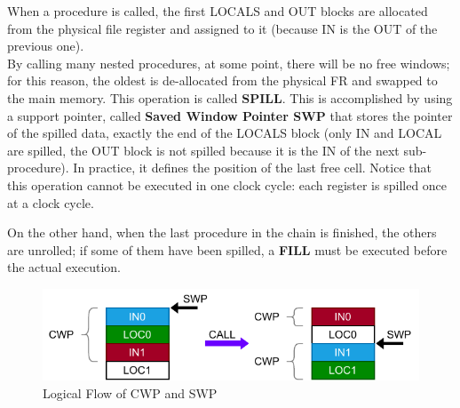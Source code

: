 When a procedure is called, the first LOCALS and OUT blocks are allocated from the physical file register and assigned to it (because IN is the OUT of the previous one).\\

By calling many nested procedures, at some point, there will be no free windows; for this reason, the oldest is de-allocated from the physical FR and swapped to the main memory. This operation is called \textbf{SPILL}. This is accomplished by using a support pointer, called \textbf{Saved Window Pointer SWP} that stores the pointer of the spilled data, exactly the end of the LOCALS block (only IN and LOCAL are spilled, the OUT block is not spilled because it is the IN of the next sub-procedure). In practice, it defines the position of the last free cell. Notice that this operation cannot be executed in one clock cycle: each register is spilled once at a clock cycle.\newline\newline

On the other hand, when the last procedure in the chain is finished, the others are unrolled; if some of them have been spilled, a \textbf{FILL} must be executed before the actual execution.\newline\newline

\begin{figure}[H]
    \centering
    \includegraphics[width=1.0\textwidth]{chapters/4_DecodeStage/images/DLX_RF_CWP_SWP.pdf}
    \caption{Logical Flow of CWP and SWP}
    \label{cwp_swp}
\end{figure}


